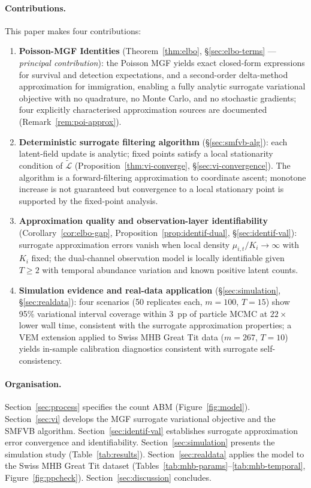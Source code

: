 \documentclass[review,12pt]{elsarticle}
\theoremstyle{definition}
\begin{document}
\paragraph{Contributions.}
This paper makes four contributions:
\begin{enumerate}[label=(\roman*)]
\item \textbf{Poisson-MGF Identities} (Theorem~\ref{thm:elbo},
  \S\ref{sec:elbo-terms} --- \emph{principal contribution}): the Poisson MGF
  yields exact closed-form expressions for survival and detection expectations,
  and a second-order delta-method approximation for immigration, enabling a
  fully analytic surrogate variational objective with no quadrature, no Monte
  Carlo, and no stochastic gradients; four explicitly characterised approximation
  sources are documented (Remark~\ref{rem:poi-approx}).
\item \textbf{Deterministic surrogate filtering algorithm} (\S\ref{sec:smfvb-alg}):
  each latent-field update is analytic; fixed points satisfy a local stationarity
  condition of $\tilde{\mathcal{L}}$
  (Proposition~\ref{thm:vi-converge}, \S\ref{sec:vi-convergence}).
  The algorithm is a forward-filtering approximation to coordinate ascent;
  monotone increase is not guaranteed but convergence to a local stationary
  point is supported by the fixed-point analysis.
\item \textbf{Approximation quality and observation-layer identifiability}
  (Corollary~\ref{cor:elbo-gap}, Proposition~\ref{prop:identif-dual},
  \S\ref{sec:identif-val}): surrogate approximation errors vanish when
  local density $\mu_{i,t}/K_i\to\infty$ with $K_i$ fixed;
  the dual-channel observation model is locally identifiable given
  $T\ge2$ with temporal abundance variation and known positive latent counts.
\item \textbf{Simulation evidence and real-data application}
  (\S\ref{sec:simulation}, \S\ref{sec:realdata}): four scenarios
  (50 replicates each, $m=100$, $T=15$) show 95\% variational interval coverage within
  3~pp of particle MCMC at $22\times$ lower wall time, consistent with
  the surrogate approximation properties; a VEM extension applied to Swiss
  MHB Great Tit data ($m=267$, $T=10$) yields in-sample calibration
  diagnostics consistent with surrogate self-consistency.
\end{enumerate}

\paragraph{Organisation.}
Section~\ref{sec:process} specifies the count ABM (Figure~\ref{fig:model}).
Section~\ref{sec:vi} develops the MGF surrogate variational objective and the SMFVB algorithm.
Section~\ref{sec:identif-val} establishes surrogate approximation error
convergence and identifiability.
Section~\ref{sec:simulation} presents the simulation study
(Table~\ref{tab:results}).
Section~\ref{sec:realdata} applies the model to the Swiss MHB Great Tit dataset
(Tables~\ref{tab:mhb-params}--\ref{tab:mhb-temporal}, Figure~\ref{fig:ppcheck}).
Section~\ref{sec:discussion} concludes.
\end{document}
